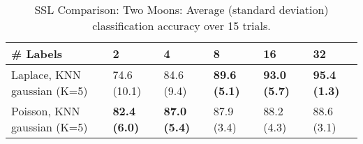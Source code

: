 \documentclass{article}
\begin{document}
\begin{table*}[t!]
\vspace{-3mm}
\caption{SSL Comparison: Two Moons: Average (standard deviation) classification accuracy over 15 trials.}
\vspace{-3mm}
\label{tab:SSL Comparison: Two Moons}
\vskip 0.15in
\begin{center}
\begin{small}
\begin{sc}
\begin{tabular}{llllll}
\toprule
\# Labels&\textbf{2}&\textbf{4}&\textbf{8}&\textbf{16}&\textbf{32}\\
\midrule
Laplace, KNN gaussian (K=5)&74.6 (10.1)      &84.6 (9.4)      &{\bf 89.6 (5.1)}&{\bf 93.0 (5.7)}&{\bf 95.4 (1.3)}\\
Poisson, KNN gaussian (K=5)&{\bf 82.4 (6.0)}&{\bf 87.0 (5.4)}&87.9 (3.4)      &88.2 (4.3)      &88.6 (3.1)      \\
\bottomrule
\end{tabular}
\end{sc}
\end{small}
\end{center}
\vskip -0.1in
\end{table*}
\end{document}
